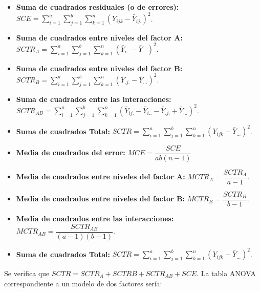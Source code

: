 \begin{itemize}
\item \textbf{Suma de cuadrados residuales (o de errores):} $SCE=\sum_{i=1}^a\sum_{j=1}^b\sum_{k=1}^n(Y_{ijk}-\bar{Y}_{ij.})^2$.
\item \textbf{Suma de cuadrados entre niveles del factor A:} $SCTR_A=\sum_{i=1}^a\sum_{j=1}^b\sum_{k=1}^n(\bar{Y}_{i..}-\bar{Y}_{...})^2$.
\item \textbf{Suma de cuadrados entre niveles del factor B:} $SCTR_B=\sum_{i=1}^a\sum_{j=1}^b\sum_{k=1}^n(\bar{Y}_{.j.}-\bar{Y}_{...})^2$.
\item \textbf{Suma de cuadrados entre las interacciones:} $SCTR_{AB}=\sum_{i=1}^a\sum_{j=1}^b\sum_{k=1}^n(\bar{Y}_{ij.}-\bar{Y}_{i..}-\bar{Y}_{.j.}+\bar{Y}_{...})^2$.
\item \textbf{Suma de cuadrados Total:} $SCTR=\sum_{i=1}^a\sum_{j=1}^b\sum_{k=1}^n(Y_{ijk}-\bar{Y}_{...})^2$.
\item \textbf{Media de cuadrados del error:} $MCE=\dfrac{SCE}{ab(n-1)}$
\item \textbf{Media de cuadrados entre niveles del factor A:} $MCTR_A=\dfrac{SCTR_A}{a-1}$.
\item \textbf{Media de cuadrados entre niveles del factor B:} $MCTR_B=\dfrac{SCTR_B}{b-1}$.
\item \textbf{Media de cuadrados entre las interacciones:} $MCTR_{AB}=\dfrac{SCTR_{AB}}{(a-1)(b-1)}$.
\item \textbf{Suma de cuadrados Total:} $SCTR=\sum_{i=1}^a\sum_{j=1}^b\sum_{k=1}^n(Y_{ijk}-\bar{Y}_{...})^2$.
\end{itemize}

Se verifica que $SCTR=SCTR_A+SCTRB+SCTR_{AB}+SCE$. La tabla ANOVA correspondiente a un modelo de dos factores ser\'ia:
\\[10pt]

